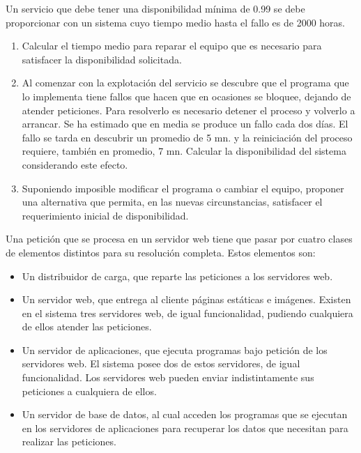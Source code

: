 \Problem[6]
Un  servicio que debe tener una disponibilidad mínima de 0.99
se debe proporcionar con un sistema cuyo tiempo medio hasta el fallo es de
 2000 horas.
\begin{enumerate}
	\item Calcular el tiempo medio para reparar el equipo que es necesario para satisfacer la disponibilidad solicitada.
	\item Al comenzar con la explotación del servicio se descubre que el
programa que lo implementa tiene fallos que hacen que en ocasiones se
bloquee, dejando de atender peticiones. Para resolverlo es necesario
detener el proceso y volverlo a arrancar. Se ha estimado que en media se
 produce un fallo cada dos días. El fallo se tarda en descubrir un
promedio de 5 mn. y la reiniciación del proceso requiere, también en
promedio, 7 mn. Calcular la disponibilidad del sistema considerando este
 efecto.
	\item Suponiendo imposible modificar el programa o cambiar el equipo,
proponer una alternativa que permita, en las nuevas circunstancias,
satisfacer el requerimiento inicial de disponibilidad.
\end{enumerate}

\TheSolution



\Problem[7]
Una petición que se procesa en un servidor web tiene que pasar por
cuatro clases de elementos distintos para su resolución completa. Estos
elementos son:
  \begin{itemize}
    	\item Un distribuidor de carga, que reparte las peticiones a los servidores web.
    	\item Un servidor web, que entrega al cliente páginas estáticas e
imágenes. Existen en el sistema tres servidores web, de igual
funcionalidad, pudiendo cualquiera de ellos atender las peticiones.
    	\item Un servidor de aplicaciones, que ejecuta programas bajo petición
 de los servidores web. El sistema posee dos de estos servidores, de
igual funcionalidad. Los servidores web pueden enviar indistintamente
sus peticiones a cualquiera de ellos.
    	\item Un servidor de base de datos, al cual acceden los programas que
se ejecutan en los servidores de aplicaciones para recuperar los datos
que necesitan para realizar las peticiones.
  \end{itemize}


